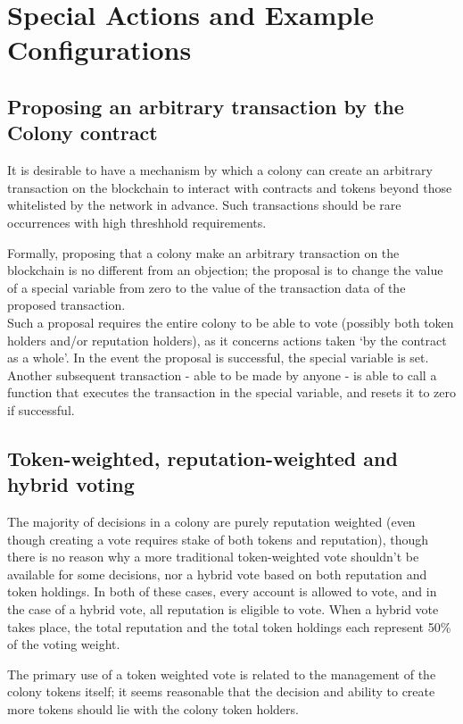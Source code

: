 \section{Special Actions and Example Configurations}\label{sec:special-cases}


\subsection{Proposing an arbitrary transaction by the Colony contract}\label{sec:arbitrary-transaction}
It is desirable to have a mechanism by which a colony can create an arbitrary transaction on the blockchain to interact with contracts and tokens beyond those whitelisted by the network in advance. Such transactions should be rare occurrences with high threshhold requirements.

Formally, proposing that a colony make an arbitrary transaction on the blockchain is no different from an objection; the proposal is to change the value of a special variable from zero to the value of the transaction data of the proposed transaction.\\
Such a proposal requires the entire colony to be able to vote (possibly both token holders and/or reputation holders), as it concerns actions taken `by the contract as a whole'. In the event the proposal is successful, the special variable is set. Another subsequent transaction - able to be made by anyone - is able to call a function that executes the transaction in the special variable, and resets it to zero if successful.

\subsection{Token-weighted, reputation-weighted and hybrid voting}
The majority of decisions in a colony are purely reputation weighted (even though creating a vote requires stake of both tokens and reputation), though there is no reason why a more traditional token-weighted vote shouldn't be available for some decisions, nor a hybrid vote based on both reputation and token holdings. In both of these cases, every account is allowed to vote, and in the case of a hybrid vote, all reputation is eligible to vote. When a hybrid vote takes place, the total reputation and the total token holdings each represent 50\% of the voting weight.

The primary use of a token weighted vote is related to the management of the colony tokens itself; it seems reasonable that the decision and ability to create more tokens should lie with the colony token holders.

